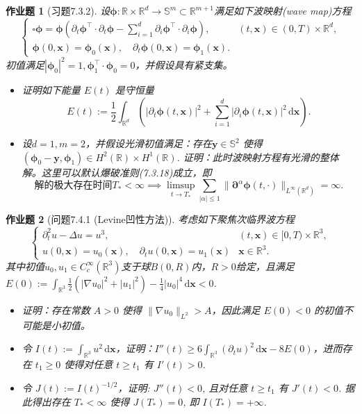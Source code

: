 \documentclass[UTF8,fontset=windows,12pt]{ctexart}
\theoremstyle{kaiti-theorem}
\newtheorem{problem}{作业题}
\numberwithin{equation}{section}
\newcommand{\R}{\mathbb{R}}
\newcommand{\bds}[1]{\boldsymbol{#1}}  %
\newcommand{\sph}{\mathbb{S}}
\newcommand{\p}{\partial}
\newcommand{\pb}{\boldsymbol{\partial}}
\newcommand{\lap}{\Delta}
\newcommand{\nab}{\nabla}
\newcommand{\dxx}{\,\mathrm{d}\bds{x}}
\newcommand{\ird}{\int_{\R^d}}
\newcommand{\xx}{{\bds{x}}}
\newcommand{\yy}{{\bds{y}}}
\begin{document}
\begin{problem}[习题7.3.2]
设$\bds{\phi}:\R\times\R^d\to\sph^m\subset \R^{m+1}$满足如下波映射(wave map)方程
\[
\begin{cases} 
\square \bds{\phi}=  \bds{\phi}\left(\p_t  \bds{\phi}^\top\cdot \p_t  \bds{\phi} - \sum\limits_{i=1}^d \p_i \bds{\phi}^\top \cdot \p_i  \bds{\phi} \right), & (t, \xx) \in (0, T) \times \R^d, \\ 
 \bds{\phi}(0, \xx) =  \bds{\phi}_0(\xx), \quad \p_t  \bds{\phi}(0, \xx) =  \bds{\phi}_1(\xx). 
\end{cases}
\]初值满足$| \bds{\phi}_0 |^2=1,  \bds{\phi}_1^\top \cdot  \bds{\phi}_0 = 0$，并假设具有紧支集。
\begin{itemize}
\item [(1)]  证明如下能量 $E(t)$ 是守恒量$$E(t):=\frac12\ird \left(|\p_t  \bds{\phi}(t,\xx)|^2 + \sum_{i=1}^d |\p_i  \bds{\phi}(t,\xx)|^2 \dxx\right).$$
\item [(2)]  设$d=1,m=2$，并假设光滑初值满足：存在$\yy\in \sph^2$ 使得 $( \bds{\phi}_0-\yy, \bds{\phi}_1)\in H^2(\R)\times H^1(\R)$. 证明：此时波映射方程有光滑的整体解。这里可以默认爆破准则(7.3.18)成立，即
\[
\text{解的极大存在时间}T_*<\infty\implies\limsup_{t\to T_*}\sum\limits_{|\alpha|\leqslant 1} \|\pb^\alpha  \bds{\phi}(t,\cdot)\|_{L^\infty(\R^d)}=\infty.
\]
\end{itemize}
\end{problem}


\begin{problem}[问题7.4.1 (Levine凹性方法)]
考虑如下聚焦次临界波方程
\[
\begin{cases} 
\p_t^2 u - \lap u = u^3, & (t, \xx) \in [0, T) \times \R^3, \\ 
u(0, \xx) = u_0(\xx), \quad \p_t u(0, \xx) = u_1(\xx)&\xx\in\R^3. \end{cases}
\]其中初值$u_0,u_1\in C_c^\infty(\R^3)$支于球$B(0,R)$内，$R>0$给定，且满足$E(0):=\int_{\R^3}\frac12(|\nab u_0|^2+|u_1|^2)-\frac14 |u_0|^4 \dxx<0$.
\begin{itemize}
\item [(1)] 证明：存在常数 $A>0$ 使得 $\|\nabla u_0\|_{L^2}>A$，因此满足 $E(0)<0$ 的初值不可能是小初值。
\item [(2)] 令 $I(t):=\int_{\R^3} u^2\dxx$，证明：$I''(t)\geqslant 6\int_{\R^3}(\p_t u)^2\dxx-8E(0)$，进而存在 $t_1\geqslant 0$ 使得对任意 $t\geqslant t_1$ 有 $I'(t)>0$.
\item [(3)] 令 $J(t):=I(t)^{-1/2}$，证明: $J''(t)<0$, 且对任意 $t\geqslant t_1$ 有 $J'(t)<0$. 据此得出存在 $T_*<\infty$ 使得 $J(T_*)=0$, 即 $I(T_*)=+\infty$.
\end{itemize}
\end{problem}
\end{document}
